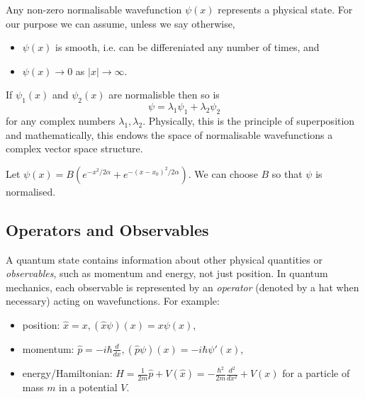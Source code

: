 \documentclass[a4paper]{article}
\begin{document}
Any non-zero normalisable wavefunction $\psi(x)$ represents a physical state. For our purpose we can assume, unless we say otherwise,
\begin{assumption}\leavevmode
\begin{itemize}
\item $\psi(x)$ is smooth, i.e. can be differeniated any number of times, and
  \item $\psi(x) \to 0$ as $|x|\to\infty$.
\end{itemize}
\end{assumption}

If $\psi_1(x)$ and $\psi_2(x)$ are normalisble then so is
\[
  \psi = \lambda_1\psi_1 + \lambda_2\psi_2
\]
for any complex numbers $\lambda_1, \lambda_2$. Physically, this is the principle of superposition and mathematically, this endows the space of normalisable wavefunctions a complex vector space structure.

\begin{eg}
  Let $\psi(x) = B(e^{-x^2/2\alpha}+e^{-(x-x_0)^2/2\alpha})$. We can choose $B$ so that $\psi$ is normalised.
  \begin{center}
  \end{center}
 
\end{eg}

\subsection{Operators and Observables}

A quantum state contains information about other physical quantities or \emph{observables}, such as momentum and energy, not just position. In quantum mechanics, each observable is represented by an \emph{operator} (denoted by a hat when necessary) acting on wavefunctions. For example:
\begin{itemize}
  \item position: $\hat x = x, (\hat{x}\psi)(x) = x\psi(x)$,
  \item momentum: $\hat{p} = -i\hbar \frac{d}{dx}, (\hat{p}\psi)(x) = -i\hbar\psi'(x)$,
  \item energy/Hamiltonian: $H = \frac{1}{2m}\hat{p} + V(\hat{x}) = -\frac{\hbar^2}{2m}\frac{d^2}{dx^2} + V(x)$ for a particle of mass $m$ in a potential $V$.
  \end{itemize}
\end{document}
